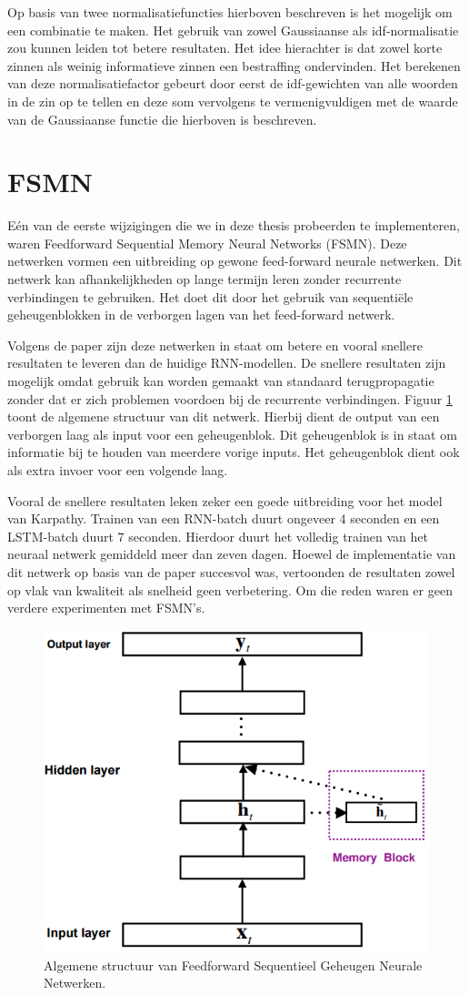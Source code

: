 Op basis van twee normalisatiefuncties hierboven beschreven is het mogelijk om een combinatie te maken. Het gebruik van zowel Gaussiaanse als idf-normalisatie zou kunnen leiden tot betere resultaten. Het idee hierachter is dat zowel korte zinnen als weinig informatieve zinnen een bestraffing ondervinden. Het berekenen van deze normalisatiefactor gebeurt door eerst de idf-gewichten van alle woorden in de zin op te tellen en deze som vervolgens te vermenigvuldigen met de waarde van de Gaussiaanse functie die hierboven is beschreven.

\section{FSMN}
E\'en van de eerste wijzigingen die we in deze thesis probeerden te implementeren, waren Feedforward Sequential Memory Neural Networks (FSMN)\cite{Zhang}. Deze netwerken vormen een uitbreiding op gewone feed-forward neurale netwerken. Dit netwerk kan afhankelijkheden op lange termijn leren zonder recurrente verbindingen te gebruiken. Het doet dit door het gebruik van sequenti\"ele geheugenblokken in de verborgen lagen van het feed-forward netwerk. 

Volgens de paper zijn deze netwerken in staat om betere en vooral snellere resultaten te leveren dan de huidige RNN-modellen. De snellere resultaten zijn mogelijk omdat gebruik kan worden gemaakt van standaard terugpropagatie zonder dat er zich problemen voordoen bij de recurrente verbindingen. Figuur \ref{fig:fsmn} toont de  algemene structuur van dit netwerk. Hierbij dient de output van een verborgen laag als input voor een geheugenblok. Dit geheugenblok is in staat om informatie bij te houden van meerdere vorige inputs. Het geheugenblok dient ook als extra invoer voor een volgende laag.

Vooral de snellere resultaten leken zeker een goede uitbreiding voor het model van Karpathy. Trainen van een RNN-batch duurt ongeveer 4 seconden en een LSTM-batch duurt 7 seconden. Hierdoor duurt het volledig trainen van het neuraal netwerk gemiddeld meer dan zeven dagen.
Hoewel de implementatie van dit netwerk op basis van de paper succesvol was, vertoonden de resultaten zowel op vlak van kwaliteit als snelheid geen verbetering. Om die reden waren er geen verdere experimenten met FSMN's.

\begin{figure}[tb]
	\centering
	\includegraphics[width=0.6\linewidth]{Images/FSMN}
	\caption{Algemene structuur van Feedforward Sequentieel Geheugen Neurale Netwerken.}
	\label{fig:fsmn}
\end{figure}

